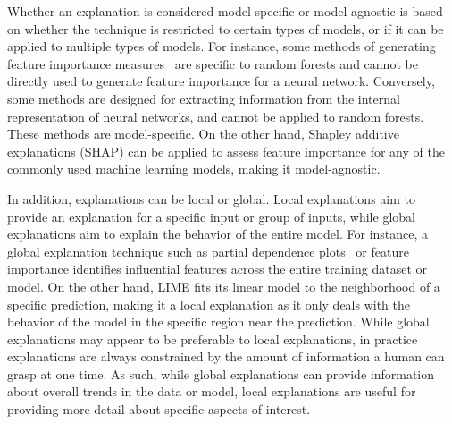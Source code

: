 \documentclass[graybox]{svmult}
\newcommand\todo[1]{\textcolor{red}{TODO: #1}}
\begin{document}
Whether an explanation is considered model-specific or model-agnostic 
is based on whether the technique is restricted to certain types of models, 
or if it can be applied to multiple types of models. 
For instance, some methods of generating feature importance measures~\cite{randForest_Breiman_ML_01} 
are specific to random forests and cannot be directly used to 
generate feature importance for a neural network. 
Conversely, some methods are designed for extracting information 
from the internal representation of neural networks, 
and cannot be applied to random forests. 
These methods are model-specific. 
On the other hand, Shapley additive explanations (SHAP) can be applied to 
assess feature importance for any of the commonly used machine learning models, 
making it model-agnostic.

In addition, explanations can be local or global. 
Local explanations aim to provide an explanation for a specific input or group of inputs, 
while global explanations aim to explain the behavior of the entire model. 
For instance, a global explanation technique such as 
partial dependence plots~\cite{EstatLearn_Hastie_01} or feature importance 
identifies influential features across the entire training dataset or model. 
On the other hand, LIME fits its linear model to the neighborhood of a specific prediction, 
making it a local explanation as it only deals with the behavior of the model 
in the specific region near the prediction. 
While global explanations may appear to be preferable to local explanations, 
in practice explanations are always constrained by the amount of information 
a human can grasp at one time. 
As such, while global explanations can provide information 
about overall trends in the data or model, 
local explanations are useful for providing more detail about specific aspects of interest.




\end{document}
